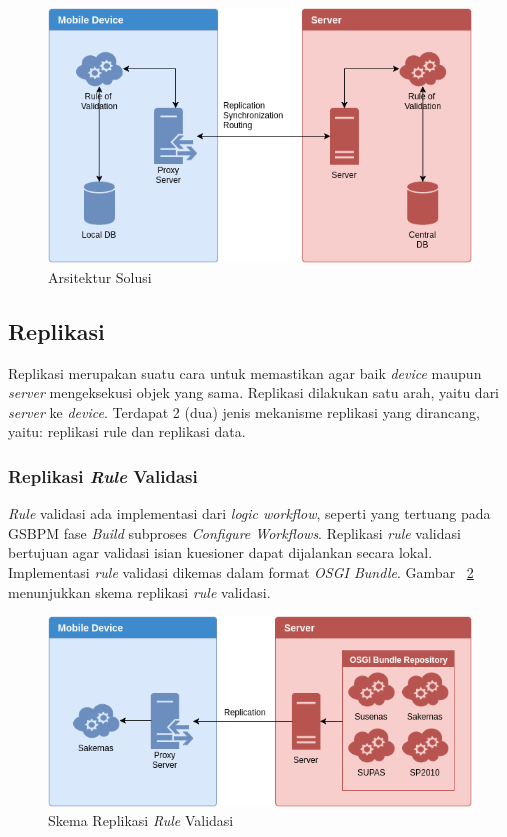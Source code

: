 \begin{figure}[h]
    \centering
    \includegraphics[width=.87\textwidth]{../../Resources/Images/architecture-solution}
    \caption{Arsitektur Solusi}
    \label{fig:architecture-solution}
\end{figure}


\subsection{Replikasi}

Replikasi merupakan suatu cara untuk memastikan agar baik \textit{device} maupun \textit{server} mengeksekusi objek yang sama. Replikasi dilakukan satu arah, yaitu dari \textit{server} ke \textit{device}. Terdapat 2 (dua) jenis mekanisme replikasi yang dirancang, yaitu: replikasi rule dan replikasi data.


\subsubsection{Replikasi \textit{Rule} Validasi}

\textit{Rule} validasi ada implementasi dari \textit{logic workflow}, seperti yang tertuang pada GSBPM fase \textit{Build} subproses \textit{Configure Workflows}. Replikasi \textit{rule} validasi bertujuan agar validasi isian kuesioner dapat dijalankan secara lokal. Implementasi \textit{rule} validasi dikemas dalam format \textit{OSGI Bundle}. Gambar ~\ref{fig:architecture-rule-replication} menunjukkan skema replikasi \textit{rule} validasi.

\begin{figure}[h]
    \centering
    \includegraphics[width=.93\textwidth]{../../Resources/Images/architecture-rule-replication}
    \caption{Skema Replikasi \textit{Rule} Validasi}
    \label{fig:architecture-rule-replication}
\end{figure}


